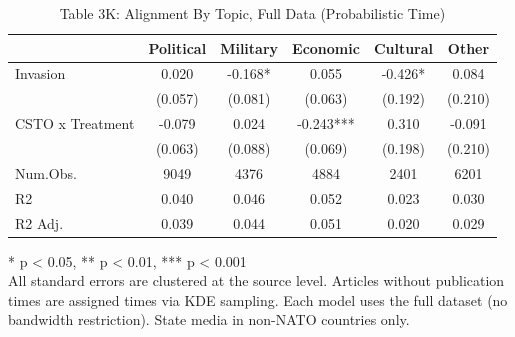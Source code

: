 \begin{table}[!t]
\caption{Table 3K: Alignment By Topic, Full Data (Probabilistic Time)} 
\fontsize{12.0pt}{14.4pt}\selectfont
\begin{tabular*}{\linewidth}{@{\extracolsep{\fill}}lccccc}
\toprule
  & Political & Military & Economic & Cultural & Other \\ 
\midrule\addlinespace[2.5pt]
Invasion & 0.020 & -0.168* & 0.055 & -0.426* & 0.084 \\ 
 & (0.057) & (0.081) & (0.063) & (0.192) & (0.210) \\ 
CSTO x Treatment & -0.079 & 0.024 & -0.243*** & 0.310 & -0.091 \\ 
{} & {(0.063)} & {(0.088)} & {(0.069)} & {(0.198)} & {(0.210)} \\ 
Num.Obs. & 9049 & 4376 & 4884 & 2401 & 6201 \\ 
R2 & 0.040 & 0.046 & 0.052 & 0.023 & 0.030 \\ 
R2 Adj. & 0.039 & 0.044 & 0.051 & 0.020 & 0.029 \\ 
\bottomrule
\end{tabular*}
\begin{minipage}{\linewidth}
* p < 0.05, ** p < 0.01, *** p < 0.001\\
All standard errors are clustered at the source level. Articles without
publication times are assigned times via KDE sampling. Each model uses the full
dataset (no bandwidth restriction). State media in non-NATO countries only.\\
\end{minipage}
\end{table}

